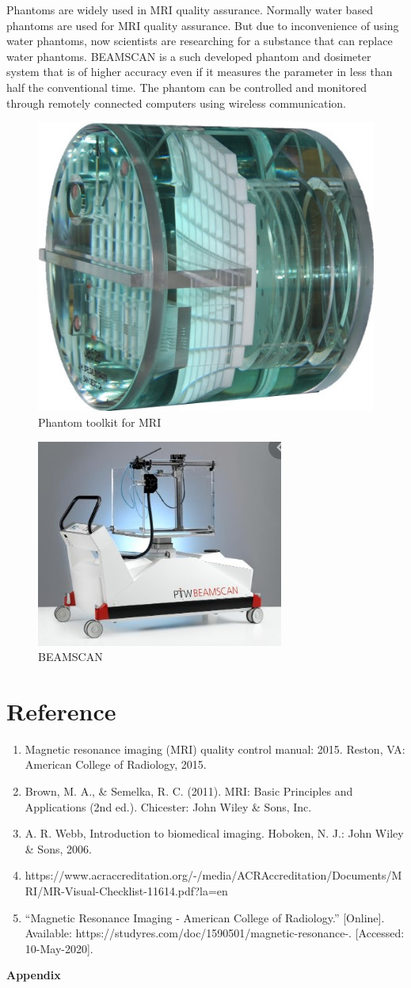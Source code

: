 \documentclass[12pt]{article}
\begin{document}
Phantoms are widely used in MRI quality assurance. Normally water based phantoms are used for MRI quality assurance. But due to inconvenience of using water phantoms, now scientists are researching for a substance that can replace water phantoms. BEAMSCAN is a such developed phantom and dosimeter system that is of higher accuracy even if it measures the parameter in less than half the conventional time. The phantom can be controlled and monitored through remotely connected computers using wireless communication.

\begin{figure}[h!]
  \centering
  \includegraphics[width=0.3\linewidth]{p.jpg}
  \caption{\small{Phantom toolkit for MRI}}
  \label{fig:Phantom toolkit for MRI}
\end{figure}
\begin{figure}[h!]
  \centering
  \includegraphics[width=0.3\linewidth]{beam.jpg}
  \caption{\small{BEAMSCAN}}
  \label{fig:Phantom Beamscan toolkit for MRI}
\end{figure}

\pagebreak
\section{Reference}
\begin{enumerate}
    \item Magnetic resonance imaging (MRI) quality control manual: 2015. Reston, VA: American College of Radiology, 2015.
    \item Brown, M. A., \& Semelka, R. C. (2011). MRI: Basic Principles and Applications (2nd ed.). Chicester: John Wiley \& Sons, Inc.
    \item A. R. Webb, Introduction to biomedical imaging. Hoboken, N. J.: John Wiley \& Sons, 2006.
    \item https://www.acraccreditation.org/-/media/ACRAccreditation/Documents/MRI/MR-Visual-Checklist-11614.pdf?la=en
    \item “Magnetic Resonance Imaging - American College of Radiology.” [Online]. Available: https://studyres.com/doc/1590501/magnetic-resonance-. [Accessed: 10-May-2020].
    
    
\end{enumerate}
\pagebreak
\textbf{\Large{Appendix}}
\begin{appendix}
  \listoffigures
\end{appendix}
\end{document}
